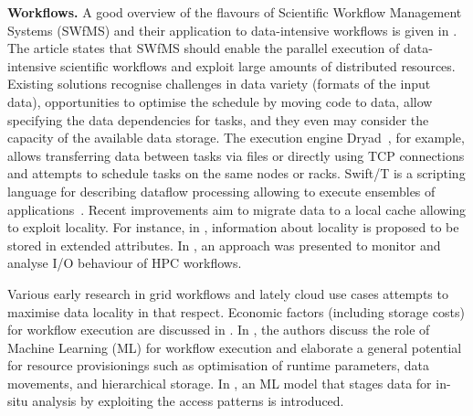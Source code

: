 \documentclass{superfri}
\begin{document}
\smallskip

\textbf{Workflows. }
A good overview of the flavours of Scientific Workflow Management Systems (SWfMS) and their application to data-intensive workflows is given in \cite{liu2015survey}.
The article states that SWfMS should enable the parallel execution of data-intensive scientific workflows and exploit large amounts of distributed resources.
Existing solutions recognise challenges in data variety (formats of the input data), opportunities to optimise the schedule by moving code to data, allow specifying the data dependencies for tasks, and they even may consider the capacity of the available data storage.
The execution engine Dryad~\cite{isard2007dryad}, for example, allows transferring data between tasks via files or directly using TCP connections and attempts to schedule tasks on the same nodes or racks.
Swift/T is a scripting language for describing dataflow processing allowing to execute ensembles of applications~\cite{ozik2016desktop}.
Recent improvements aim to migrate data to a local cache allowing to exploit locality.
For instance, in \cite{dai2018cross}, information about locality is proposed to be stored in extended attributes.
In \cite{TUIBIHWLSC19}, an approach was presented to monitor and analyse I/O behaviour of HPC workflows.

Various early research in grid workflows and lately cloud use cases attempts to maximise data locality in that respect.
Economic factors (including storage costs) for workflow execution are discussed in \cite{alkhanak2016cost}.
In \cite{deelman2019role}, the authors discuss the role of Machine Learning (ML) for workflow execution and elaborate a general potential for resource provisionings such as optimisation of runtime parameters, data movements, and hierarchical storage.
In \cite{subedi2019leveraging}, an ML model that stages data for in-situ analysis by exploiting the access patterns is introduced.


\end{document}
